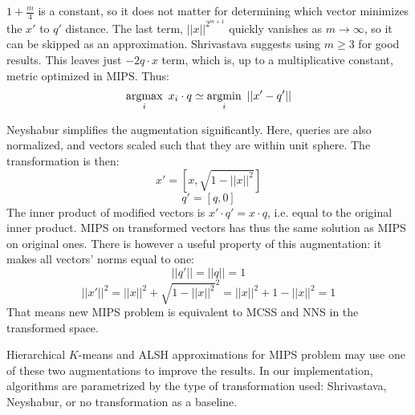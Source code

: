 $ 1 + \frac{m}{4} $ is a constant, so it does not matter for determining 
which vector minimizes the $x'$ to $q'$ distance. The last term, 
$||x||^{2^{m+1}}$ quickly vanishes as $m \to \infty$, so it can be skipped
as an approximation. Shrivastava suggests using $m \ge 3$ for good results.
This leaves just $ - 2 q \cdot x $ term, which is, up to a multiplicative
constant, metric optimized in MIPS.
Thus:
$$
\operatorname*{argmax}_{i}\ x_i \cdot q \simeq \operatorname*{argmin}_{i}\ ||x' - q'||
$$

Neyshabur simplifies the augmentation significantly. Here, queries are also
normalized, and vectors scaled such that they are within unit sphere. The
transformation is then:
$$
x' = [x, \sqrt{1 - ||x||^2}]
$$
$$
q' = [q, 0]
$$
The inner product of modified vectors is $x' \cdot q' = x \cdot q$, i.e. equal
to the original inner product. MIPS on transformed vectors has thus the same
solution as MIPS on original ones. There is however a useful property of this
augmentation: it makes all vectors' norms equal to one: 
$$ ||q'|| = ||q|| = 1 $$
$$ ||x'||^2 = ||x||^2 + \sqrt{1 - ||x||^2}^2 = ||x||^2 + 1 - ||x||^2 = 1 $$
That means new MIPS problem is equivalent to MCSS and NNS in the transformed
space.

Hierarchical $K$-means and ALSH approximations for MIPS problem may use one
of these two augmentations to improve the results. In our implementation,
algorithms are parametrized by the type of transformation used: Shrivastava,
Neyshabur, or no transformation as a baseline.
